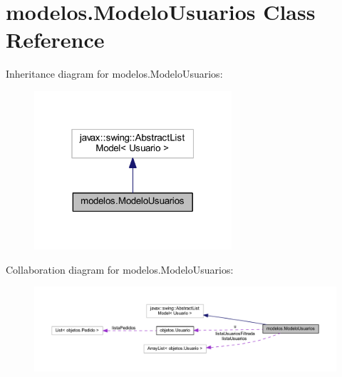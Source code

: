 \hypertarget{classmodelos_1_1_modelo_usuarios}{}\section{modelos.\+Modelo\+Usuarios Class Reference}
\label{classmodelos_1_1_modelo_usuarios}


Inheritance diagram for modelos.\+Modelo\+Usuarios\+:\nopagebreak
\begin{figure}[H]
\begin{center}
\leavevmode
\includegraphics[width=208pt]{classmodelos_1_1_modelo_usuarios__inherit__graph}
\end{center}
\end{figure}


Collaboration diagram for modelos.\+Modelo\+Usuarios\+:\nopagebreak
\begin{figure}[H]
\begin{center}
\leavevmode
\includegraphics[width=350pt]{classmodelos_1_1_modelo_usuarios__coll__graph}
\end{center}
\end{figure}
